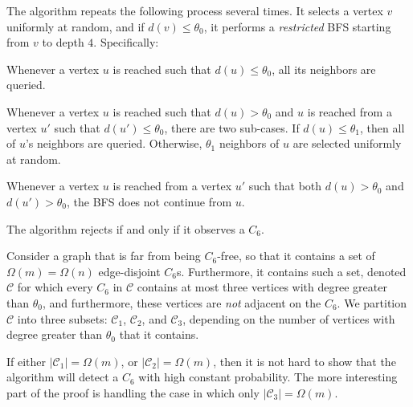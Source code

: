 \documentclass{article}
\newcommand{\calC}{{\mathcal{C}}}
\newcommand{\commentt}[1]{ {}}
\newenvironment{packed_enum}{
\begin{enumerate}
  \setlength{\itemsep}{0pt}
  \setlength{\parskip}{0pt}
  \setlength{\parsep}{0pt}
}{\end{enumerate}}
\begin{document}
The algorithm repeats the following process several times. It selects a vertex $v$ uniformly at random, and if $d(v) \leq \theta_0$, it performs a \emph{restricted} BFS starting from $v$ to depth $4$. Specifically:
\begin{packed_enum}
           \item Whenever a vertex $u$ is reached such that $d(u) \leq \theta_0$, all its neighbors are queried.
           \item Whenever a vertex $u$ is reached such that $d(u) > \theta_0$ and $u$ is reached from a vertex $u'$ such that $d(u') \leq \theta_0$, there are two sub-cases. If $d(u) \leq \theta_1$, then  all of $u$'s neighbors are queried. Otherwise,  $\theta_1$ neighbors of $u$ are selected uniformly at random. \label{step:C6_rand_nbr-overview}
           \item Whenever a vertex $u$ is reached from a vertex $u'$ such that both $d(u)>\theta_0$ and $d(u') > \theta_0$, the BFS does not continue from $u$.
\end{packed_enum}
         
The algorithm rejects if and only if it observes a $C_6$.

Consider a graph that is far from being $C_6$-free, so that it contains a set  of $\Omega(m)=\Omega(n)$ edge-disjoint $C_6$s. Furthermore, it contains such a set, denoted $\calC$ for which every $C_6$ in $\calC$ contains at most three vertices with degree greater than $\theta_0$, and furthermore, these vertices are  \emph{not} adjacent on the $C_6$. We partition $\calC$ into three subsets: $\calC_1$, $\calC_2$, and $\calC_3$, depending on the number of vertices with degree greater than $\theta_0$ that it contains.

If either $|\calC_1| = \Omega(m)$, or $|\calC_2| = \Omega(m)$, then it is not hard to show that the algorithm will detect a $C_6$ with high constant probability. The more interesting part of the proof is handling the case in which only $|\calC_3| = \Omega(m)$.
\end{document}
